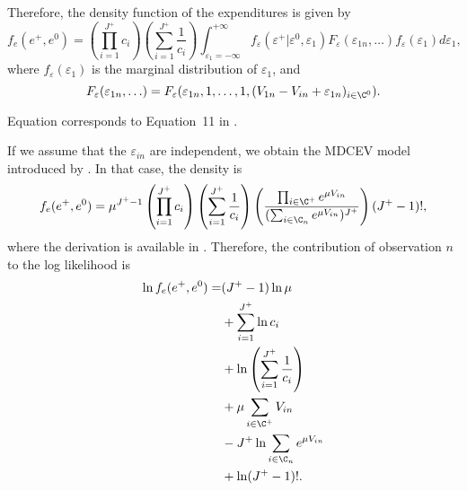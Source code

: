 \documentclass[12pt,a4paper]{article}
\begin{document}
Therefore, the density function of the expenditures is given by
\begin{equation}
  \label{eq:density}
f_e(e^+, e^0) =   \left(\prod_{i=1}^{J^+} c_i\right)\left(\sum_{i=1}^{J^+}\frac{1}{c_i}\right)\int_{\varepsilon_1=-\infty}^{+\infty}  f_\varepsilon(\varepsilon^+ | \varepsilon^0, \varepsilon_1) F_\varepsilon(\varepsilon_{1n}, \ldots)f_\varepsilon(\varepsilon_1) d\varepsilon_1,
\end{equation}
where $f_\varepsilon(\varepsilon_1)$ is the marginal distribution of $\varepsilon_1$, and
\[
F_\varepsilon(\varepsilon_{1n}, \ldots) = F_\varepsilon(\varepsilon_{1n}, 1, \ldots, 1, (V_{1n} -V_{in} + \varepsilon_{1n})_{i\in \C^0}).
\]

Equation  corresponds to Equation~11 in .

If we assume that the $\varepsilon_{in}$ are independent, we obtain the MDCEV model introduced by . In that case,  the density  is 
\begin{equation}
  f_e(e^+, e^0) = \mu^{J^+-1}\left(\prod_{i=1}^{J^+} c_i\right)\left(\sum_{i=1}^{J^+}\frac{1}{c_i}\right) \left( \frac{\prod_{i \in \C^+} e^{\mu V_{in}}}{(\sum_{i\in\C_n} e^{\mu V_{in}})^{J^+}} \right) (J^+-1)!,
\end{equation}
where the derivation is available in . Therefore, the contribution of observation $n$ to the log likelihood is
\begin{align*}
  \ln  f_e(e^+, e^0) =& (J^+-1) \ln \mu \\
  &+ \sum_{i=1}^{J^+} \ln c_i \\
  &+ \ln\left(\sum_{i=1}^{J^+}\frac{1}{c_i}\right)\\
  &+ \mu \sum_{i \in \C^+} V_{in} \\
  &- J^+ \ln \sum_{i\in\C_n} e^{\mu V_{in}} \\
  &+ \ln (J^+-1)!.
\end{align*}
\end{document}
